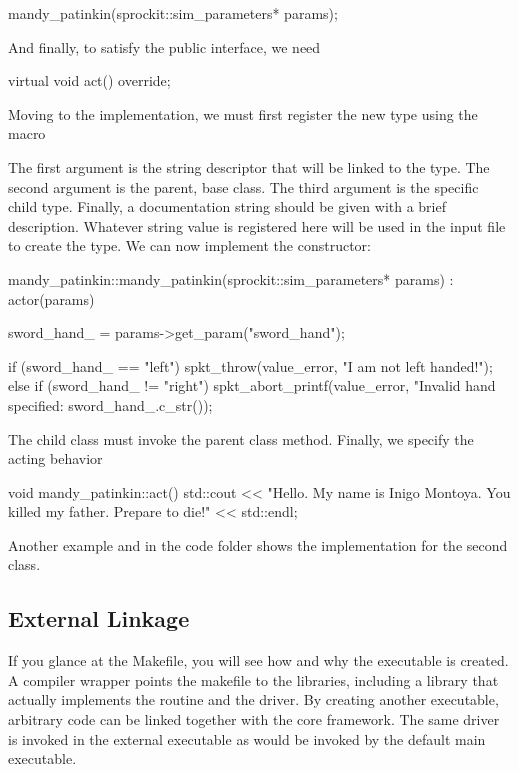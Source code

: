 \begin{CppCode}
mandy_patinkin(sprockit::sim_parameters* params);
\end{CppCode}

And finally, to satisfy the  public interface, we need

\begin{CppCode}
virtual void act() override;
\end{CppCode}

Moving to the implementation, we must first register the new type using the macro

\begin{CppCode}
namespace sstmac {
    namespace tutorial {

SpktRegister("patinkin", actor, mandy_patinkin,
    "He's on one of those shows now... NCIS? CSI?");
\end{CppCode}
The first argument is the string descriptor that will be linked to the type.
The second argument is the parent, base class. 
The third argument is the specific child type.
Finally, a documentation string should be given with a brief description.
Whatever string value is registered here will be used in the input file to create the type.
We can now implement the constructor:

\begin{CppCode}
mandy_patinkin::mandy_patinkin(sprockit::sim_parameters* params) :
  actor(params)
{
  sword_hand_ = params->get_param("sword_hand");

  if (sword_hand_ == "left"){
    spkt_throw(value_error, "I am not left handed!");
  }
  else if (sword_hand_ != "right"){
      spkt_abort_printf(value_error,
          "Invalid hand specified: %
          sword_hand_.c_str());
  }
}
\end{CppCode}
The child class must invoke the parent class method. 
Finally, we specify the acting behavior

\begin{CppCode}
void mandy_patinkin::act()
{
    std::cout << "Hello. My name is Inigo Montoya. You killed my father. Prepare to die!"
              << std::endl;
}
\end{CppCode}

Another example  and  in the code folder shows the implementation for the second class.

\subsection{External Linkage}\label{subsec:linkage}
If you glance at the Makefile, you will see how and why the executable is created.
A compiler wrapper  points the makefile to the \sstmacro libraries, including a library  that actually implements the  routine and the \sstmacro driver.
By creating another executable, arbitrary code can be linked together with the core \sstmacro framework.
The same \sstmacro driver is invoked in the external executable as would be invoked by the default main executable.

